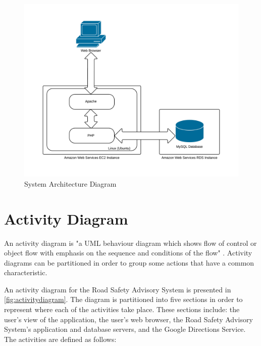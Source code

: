 \documentclass[authoryearcitations]{UoYCSproject}
\begin{document}
\begin{figure}
	\includegraphics[scale=0.7]{SystemArchitectureDiagram}
	\caption{System Architecture Diagram}
	\label{fig:sysarchitecture}
\end{figure}

\section{Activity Diagram}

An activity diagram is "a UML behaviour diagram which shows flow of control or object flow with emphasis on the sequence and conditions of the flow" \citep{uml-diagrams}. Activity diagrams can be partitioned in order to group some actions that have a common characteristic.

An activity diagram for the Road Safety Advisory System is presented in \autoref{fig:activitydiagram}. The diagram is partitioned into five sections in order to represent where each of the activities take place. These sections include: the user's view of the application, the user's web browser, the Road Safety Advisory System's application and database servers, and the Google Directions Service. The activities are defined as follows:
\end{document}
